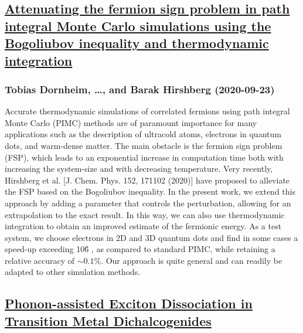 \subsection*{\href{http://arxiv.org/abs/2009.11036v1}{Attenuating the fermion sign problem in path integral Monte Carlo  simulations using the Bogoliubov inequality and thermodynamic integration}}
\subsubsection*{Tobias Dornheim, \dots, and Barak Hirshberg (2020-09-23)}
Accurate thermodynamic simulations of correlated fermions using path integral
Monte Carlo (PIMC) methods are of paramount importance for many applications
such as the description of ultracold atoms, electrons in quantum dots, and
warm-dense matter. The main obstacle is the fermion sign problem (FSP), which
leads to an exponential increase in computation time both with increasing the
system-size and with decreasing temperature. Very recently, Hirshberg et al.
[J. Chem. Phys. 152, 171102 (2020)] have proposed to alleviate the FSP based on
the Bogoliubov inequality. In the present work, we extend this approach by
adding a parameter that controls the perturbation, allowing for an
extrapolation to the exact result. In this way, we can also use thermodynamic
integration to obtain an improved estimate of the fermionic energy. As a test
system, we choose electrons in 2D and 3D quantum dots and find in some cases a
speed-up exceeding 10\^6 , as compared to standard PIMC, while retaining a
relative accuracy of $\sim0.1\%$. Our approach is quite general and can readily
be adapted to other simulation methods.

\subsection*{\href{http://arxiv.org/abs/2009.11031v1}{Phonon-assisted Exciton Dissociation in Transition Metal Dichalcogenides}}
